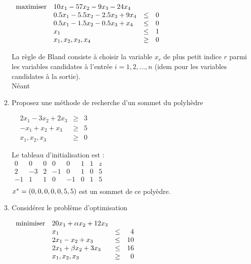 \begin{enumerate}
    $
    \begin{array}{llcr}
      \mbox{maximiser} & 10 x_1-57 x_2-9x_3-24x_4\\
      & 0.5x_1-5.5x_2-2.5x_3+9x_4 & \leq & 0\\
      & 0.5x_1-1.5x_2-0.5x_3+x_4 & \leq & 0\\
      & x_1 & \leq &1\\
      & x_1, x_2, x_3, x_4 & \geq & 0
    \end{array}
    $


    \begin{solution}
      La règle de Bland consiste à choisir la variable $x_{r}$ de plus petit indice $r$ parmi les variables candidates à l'entrée $i = 1,2, \dots, n$ (idem pour les variables candidates à la sortie). \\
      \newline
      Néant
    \end{solution}

  \item Proposez une méthode de recherche d'un sommet du polyhèdre

    $
    \begin{array}{lrcr}
      & 2x_1-3x_2 +2x_3 & \geq & 3\\
      & -x_1+x_2 +x_3 & \geq & 5\\
      & x_1, x_2, x_3 & \geq & 0
    \end{array}
    $

    \begin{solution}
       Le tableau d'initialisation est : \\
       \newline
      $\begin{array}
      {ccccccc|l}
      0&0&0&0&0&1&1&z  \\ \hline
      2&-3&2&-1&0&1&0&5 \\
      -1&1&1&0&-1&0&1&5
      \\\end{array}$\\
      \newline
      \newline
      $x^* = (0,0,0,0,0,5,5)$ est un sommet de ce polyèdre.
    \end{solution}

  \item  Considérez le problème d'optimisation

    $
    \begin{array}{llcr}
      \mbox{minimiser} & 20 x_1+\alpha x_2+12 x_3\\
      & x_1  & \leq & 4\\
      &2x_1 - x_2+x_3 & \leq & 10\\
      &2x_1+\beta x_2+ 3x_3 & \leq & 16\\
      & x_1, x_2, x_3 & \geq & 0
    \end{array}
    $



\end{enumerate}
